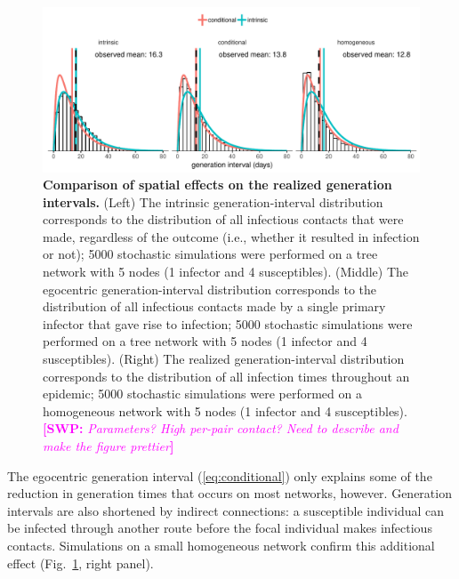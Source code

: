 \documentclass[12pt]{article}
\newcommand{\eref}[1]{(\ref{eq:#1})}
\newcommand{\fref}[1]{Fig.~\ref{fig:#1}}
\newcommand{\comment}[3]{\textcolor{#1}{\textbf{[#2: }\textsl{#3}\textbf{]}}}
\newcommand{\swp}[1]{\comment{magenta}{SWP}{#1}}
\begin{document}
\begin{figure}
\includegraphics[width=\textwidth]{../fig/local_effect.pdf}
\caption{
\textbf{Comparison of spatial effects on the realized generation intervals.}
(Left) The intrinsic generation-interval distribution corresponds to the distribution of all infectious contacts that were made, regardless of the outcome (i.e., whether it resulted in infection or not); 5000 stochastic simulations were performed on a tree network with 5 nodes (1 infector and 4 susceptibles).
(Middle) The egocentric generation-interval distribution corresponds to the distribution of all infectious contacts made by a single primary infector that gave rise to infection; 5000 stochastic simulations were performed on a tree network with 5 nodes (1 infector and 4 susceptibles).
(Right) The realized generation-interval distribution corresponds to the distribution of all infection times throughout an epidemic; 5000 stochastic simulations were performed on a homogeneous network with 5 nodes (1 infector and 4 susceptibles).
\swp{Parameters? High per-pair contact? Need to describe and make the figure prettier}
}
\label{fig:local}
\end{figure}

The egocentric generation interval \eref{conditional} only explains some of the reduction in generation times that occurs on most networks, however.
Generation intervals are also shortened by indirect connections: a susceptible individual can be infected through another route before the focal individual makes infectious contacts.
Simulations on a small homogeneous network confirm this additional effect (\fref{local}, right panel). 
\end{document}

